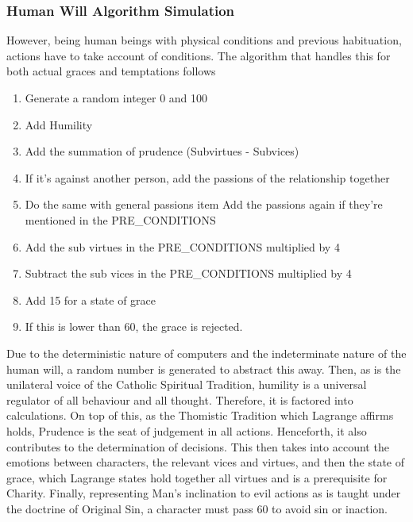 \documentclass[11pt]{article}
\begin{document}
\subsubsection{Human Will Algorithm Simulation}
However, being human beings with physical conditions and previous habituation, actions have to take account of conditions. The algorithm that handles this for both actual graces and temptations follows\:

\begin{enumerate}
	\item Generate a random integer 0 and 100
	\item Add Humility 
	\item Add the summation of prudence (Subvirtues - Subvices) 
	\item If it's against another person, add the passions of the relationship together
	\item Do the same with general passions
	item Add the passions again if they're mentioned in the PRE\_CONDITIONS
	\item Add the sub virtues in the PRE\_CONDITIONS multiplied by 4
	\item Subtract the sub vices in the PRE\_CONDITIONS multiplied by 4
	\item Add 15 for a state of grace
	\item If this is lower than 60, the grace is rejected.
\end{enumerate}

Due to the deterministic nature of computers and the indeterminate nature of the human will, a random number is generated to abstract this away. Then, as is the unilateral voice of the Catholic Spiritual Tradition, humility is a universal regulator of all behaviour and all thought. Therefore, it is factored into calculations. On top of this, as the Thomistic Tradition which Lagrange affirms holds, Prudence is the seat of judgement in all actions. Henceforth, it also contributes to the determination of decisions. This then takes into account the emotions between characters, the relevant vices and virtues, and then the state of grace, which Lagrange states hold together all virtues and is a prerequisite for Charity. Finally, representing Man's inclination to evil actions as is taught under the doctrine of Original Sin, a character must pass 60 to avoid sin or inaction. \\
\end{document}
